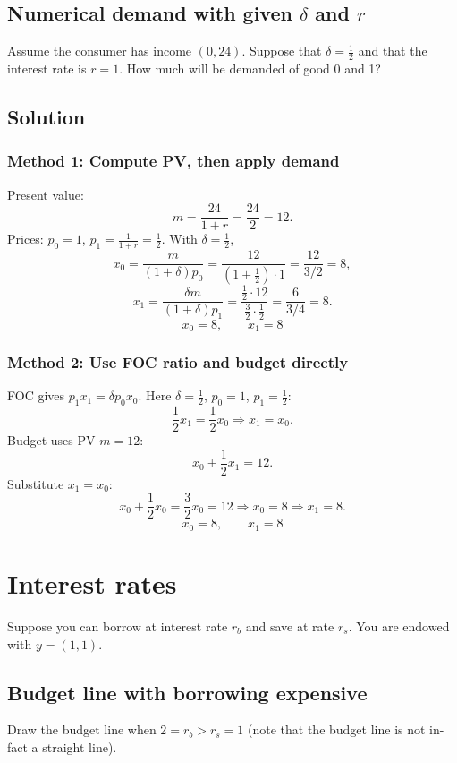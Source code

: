 \documentclass[12pt]{article}
\begin{document}
\subsection{Numerical demand with given \(\delta\) and \(r\)}
Assume the consumer has income \((0,24)\). Suppose that \(\delta=\frac{1}{2}\) and that the interest
rate is \(r=1\). How much will be demanded of good 0 and 1?

\subsection*{Solution}
\subsubsection*{Method 1: Compute PV, then apply demand}
Present value:
\[
m=\frac{24}{1+r}=\frac{24}{2}=12.
\]
Prices: \(p_0=1\), \(p_1=\frac{1}{1+r}=\frac12\). With \(\delta=\frac12\),
\[
x_0=\frac{m}{(1+\delta)p_0}=\frac{12}{(1+\frac12)\cdot 1}=\frac{12}{3/2}=8,
\]
\[
x_1=\frac{\delta m}{(1+\delta)p_1}
=\frac{\frac12\cdot 12}{\frac32\cdot \frac12}
=\frac{6}{3/4}=8.
\]
\[
\boxed{\;x_0=8,\qquad x_1=8\;}
\]

\subsubsection*{Method 2: Use FOC ratio and budget directly}
FOC gives \(p_1x_1=\delta p_0x_0\). Here \(\delta=\frac12\), \(p_0=1\), \(p_1=\frac12\):
\[
\frac12 x_1=\frac12 x_0\Rightarrow x_1=x_0.
\]
Budget uses PV \(m=12\):
\[
x_0+\frac12 x_1=12.
\]
Substitute \(x_1=x_0\):
\[
x_0+\frac12 x_0=\frac32 x_0=12\Rightarrow x_0=8\Rightarrow x_1=8.
\]
\[
\boxed{\;x_0=8,\qquad x_1=8\;}
\]

\newpage
\section{Interest rates}

Suppose you can borrow at interest rate \(r_b\) and save at rate \(r_s\).
You are endowed with \(y=(1,1)\).

\subsection{Budget line with borrowing expensive}
Draw the budget line when \(2=r_b>r_s=1\) (note that the budget line is not in-fact a
straight line).
\end{document}
